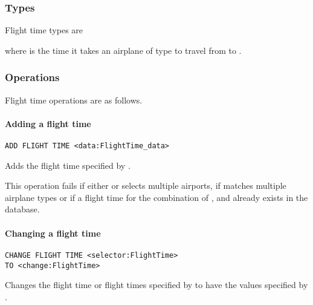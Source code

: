 \subsubsection{Types}
Flight time types are
\begin{description}
  \item[] 
  \item[] 
\end{description}
where  is the time it takes an airplane of type 
to travel from  to .

\subsubsection{Operations}
Flight time operations are as follows.

\paragraph{Adding a flight time}
\begin{operation}
  \lstinline{ADD FLIGHT TIME <data:FlightTime_data>}
  \label{op:add_flighttime}
\end{operation}
Adds the flight time specified by .

This operation fails if either  or  selects multiple
airports, if  matches multiple airplane types or if a flight time
for the combination of ,  and  already
exists in the database.

\paragraph{Changing a flight time}
\begin{operation}
  \begin{lstlisting}
CHANGE FLIGHT TIME <selector:FlightTime>
TO <change:FlightTime>
  \end{lstlisting}
  \label{op:change_flighttime}
\end{operation}
Changes the flight time or flight times specified by  to have the
values specified by .

